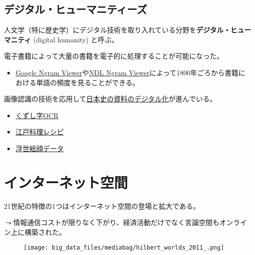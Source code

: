 \documentclass[
  xelatex,
  ja=standard]{bxjsarticle}
\providecommand{\tightlist}{%
  \setlength{\itemsep}{0pt}\setlength{\parskip}{0pt}}\usepackage{longtable,booktabs,array}
\begin{document}
\hypertarget{ux30c7ux30b8ux30bfux30ebux30d2ux30e5ux30fcux30deux30cbux30c6ux30a3ux30fcux30ba}{%
\subsection{デジタル・ヒューマニティーズ}\label{ux30c7ux30b8ux30bfux30ebux30d2ux30e5ux30fcux30deux30cbux30c6ux30a3ux30fcux30ba}}

人文学（特に歴史学）にデジタル技術を取り入れている分野を\textbf{デジタル・ヒューマニティ}
(digital humanity) と呼ぶ。

電子書籍によって大量の書籍を電子的に処理することが可能になった。

\begin{itemize}
\tightlist
\item
  \href{https://books.google.com/ngrams}{Google Ngram
  Viewer}や\href{https://lab.ndl.go.jp/service/ngramviewer/}{NDL Ngram
  Viewer}によって1800年ごろから書籍における単語の頻度を見ることができる。
\end{itemize}

画像認識の技術を応用して\href{http://codh.rois.ac.jp/project/index.html.ja}{日本史の資料のデジタル化}が進んでいる。

\begin{itemize}
\tightlist
\item
  \href{http://codh.rois.ac.jp/kuronet/}{くずし字OCR}
\item
  \href{http://codh.rois.ac.jp/edo-cooking/}{江戸料理レシピ}
\item
  \href{http://codh.rois.ac.jp/ukiyo-e/index.html.ja}{浮世絵顔データ}
\end{itemize}

\hypertarget{ux30a4ux30f3ux30bfux30fcux30cdux30c3ux30c8ux7a7aux9593}{%
\section{インターネット空間}\label{ux30a4ux30f3ux30bfux30fcux30cdux30c3ux30c8ux7a7aux9593}}

21世紀の特徴の1つはインターネット空間の登場と拡大である。

\(\leadsto\)情報通信コストが限りなく下がり、経済活動だけでなく言論空間もオンライン上に構築された。

\begin{figure}[htpb]

{\centering \texttt{[image: big\_data\_files/mediabag/hilbert\_worlds\_2011\_.png]}

}

\caption{\citet{salganik2019}}

\end{figure}
\end{document}
